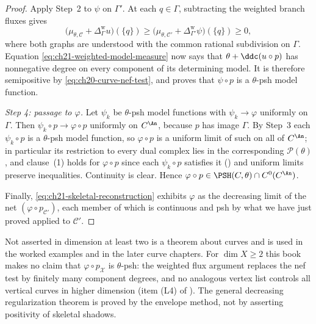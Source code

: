 \begin{proof}
Apply Step~2 to $\psi$ on $\Gamma'$.  At each $q\in\Gamma$, subtracting
the weighted branch fluxes gives
\[
 \bigl(\mu_{\theta,\mathcal C}
       +\Delta^{\mathrm w}_{\Gamma}u\bigr)(\{q\})
 \geq
 \bigl(\mu_{\theta,\mathcal C'}
       +\Delta^{\mathrm w}_{\Gamma'}\psi\bigr)(\{q\})
 \geq0,
\]
where both graphs are understood with the common rational subdivision on
$\Gamma$.  Equation \eqref{eq:ch21-weighted-model-measure} now says that
$\theta+\ddc(u\circ p)$ has nonnegative degree on every component of its
determining model.  It is therefore semipositive by
\eqref{eq:ch20-curve-nef-test}, and
 proves that $\psi\circ p$ is a
$\theta$-psh model function.

\emph{Step 4: passage to $\varphi$.}  Let $\psi_k$ be $\theta$-psh
model functions with $\psi_k\to\varphi$ uniformly on $\Gamma$.  Then
$\psi_k\circ p\to\varphi\circ p$ uniformly on $C^{\An}$, because
$p$ has image $\Gamma$.  By Step~3 each $\psi_k\circ p$ is a
$\theta$-psh model function, so $\varphi\circ p$ is a uniform limit of
such on all of $C^{\An}$; in particular its restriction to every dual
complex lies in the corresponding $\mathcal P(\theta)$, and clause~(1)
holds for $\varphi\circ p$ since each $\psi_k\circ p$ satisfies it
() and uniform limits preserve
inequalities.  Continuity is clear.  Hence
$\varphi\circ p\in\PSH(C,\theta)\cap C^0(C^{\An})$.

Finally, \eqref{eq:ch21-skeletal-reconstruction} exhibits $\varphi$ as the
decreasing limit of the net $(\varphi\circ p_{\mathcal C'})$, each member
of which is continuous and psh by what we have just proved applied to
$\mathcal C'$.
\end{proof}

\begin{warning}{Not asserted in dimension at least two}
 is a theorem about curves and is used
in the worked examples and in the later curve chapters.  For
$\dim X\geq2$ this book makes no claim that
$\varphi\circ p_{\mathcal X}$ is $\theta$-psh: the weighted flux
argument replaces the nef test by finitely many component degrees, and no
analogous vertex list controls all vertical curves in higher dimension
(item (L4) of ).  The general decreasing
regularization theorem  is proved by
the envelope method, not by asserting positivity of skeletal shadows.
\end{warning}

